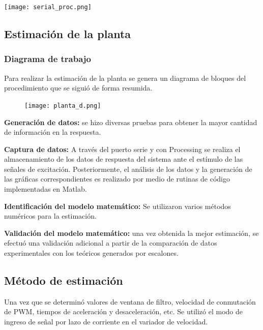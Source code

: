 \begin{center}
    \texttt{[image: serial\_proc.png]}
    \label{fig:Proce}    
\end{center}

\subsection{Estimación de la planta}
    \subsubsection{Diagrama de trabajo}

Para realizar la estimación de la planta se genera un diagrama de bloques del procedimiento que se siguió de forma resumida.

\begin{figure}[htb]
	\centering
	\texttt{[image: planta\_d.png]}
	\label{fig:planta_d}
\end{figure}

 \textbf{Generación de datos:}  se hizo diversas pruebas para obtener la mayor cantidad de información en la respuesta.

 \textbf{Captura de datos:} A través del puerto serie y con Processing se realiza el almacenamiento de los datos de respuesta del sistema ante el estímulo de las señales de excitación. Posteriormente, el análisis de los datos y la generación de las gráficas correspondientes es realizado por medio de rutinas de código implementadas en Matlab.

 \textbf{Identificación del modelo matemático:} Se utilizaron varios métodos numéricos para la estimación.

 \textbf{Validación del modelo matemático:} una vez obtenida la mejor estimación, se efectuó una validación adicional a partir de la comparación de datos experimentales con los teóricos generados por escalones.






    \subsection{Método de estimación}

    Una vez que se determinó valores de ventana de filtro, velocidad de conmutación de PWM, tiempos de aceleración y desaceleración, etc. Se utilizó el modo de ingreso de señal por lazo de corriente en el variador de velocidad. 
    
